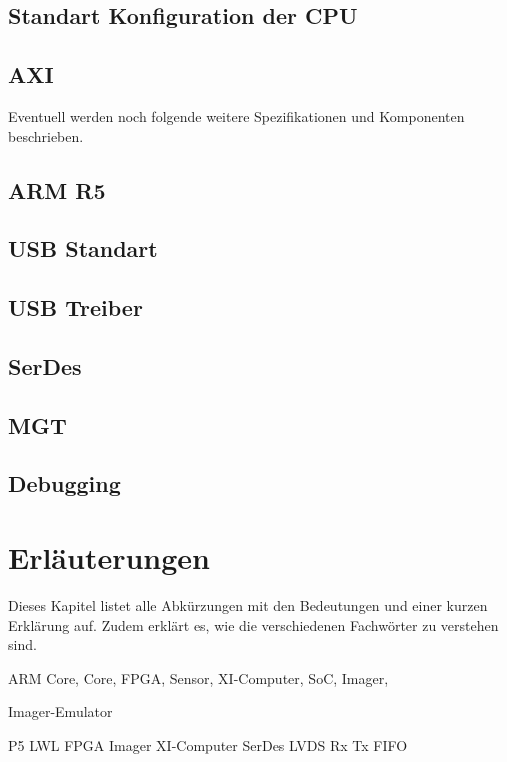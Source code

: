 \documentclass{article}
\begin{document}
\subsection{Standart Konfiguration der CPU}
\subsection{AXI}

Eventuell werden noch folgende weitere Spezifikationen und Komponenten be\-schrieben.
\subsection{ARM R5}
\subsection{USB Standart}
\subsection{USB Treiber}
\subsection{SerDes}
\subsection{MGT}
\subsection{Debugging}

\section{Erläuterungen}
Dieses Kapitel listet alle Abkürzungen mit den Bedeutungen und einer kurzen Erklärung auf. Zudem erklärt es, wie die verschiedenen Fachwörter zu verstehen sind.

ARM Core,
Core,
FPGA,
Sensor,
XI-Computer,
SoC,
Imager,

Imager-Emulator

P5
LWL
FPGA
Imager
XI-Computer
SerDes
LVDS
Rx
Tx
FIFO
\end{document}
